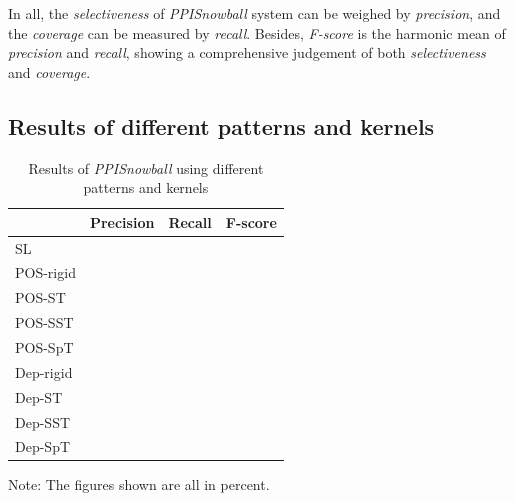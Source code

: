In all, the \emph{selectiveness} of \emph{PPISnowball} system can be weighed by \emph{precision}, and the \emph{coverage} can be measured by \emph{recall}. Besides, \emph{F-score} is the harmonic mean of \emph{precision} and \emph{recall}, showing a comprehensive judgement of both \emph{selectiveness} and \emph{coverage}.

\subsection{Results of different patterns and kernels}
\label{exp:ResultsByPtnKnl}

\begin{table}[htbp]
 \centering
 \small
 \begin{threeparttable}
 \caption{\label{tab:results}Results of \emph{PPISnowball} using different patterns and kernels}
  \begin{tabular}{lccc}
  \toprule
           &   Precision &   Recall &  F-score  \\

  \midrule
  SL            &     &     &  \\
  POS-rigid     &     &     &  \\
  POS-ST        &     &     &  \\
  POS-SST       &     &     &  \\
  POS-SpT       &     &     &  \\
  Dep-rigid     &     &     &  \\
  Dep-ST        &     &     &  \\
  Dep-SST       &     &     &  \\
  Dep-SpT       &     &     &  \\

  \bottomrule
  \end{tabular}

  Note: The figures shown are all in percent.
 \end{threeparttable}
\end{table}

